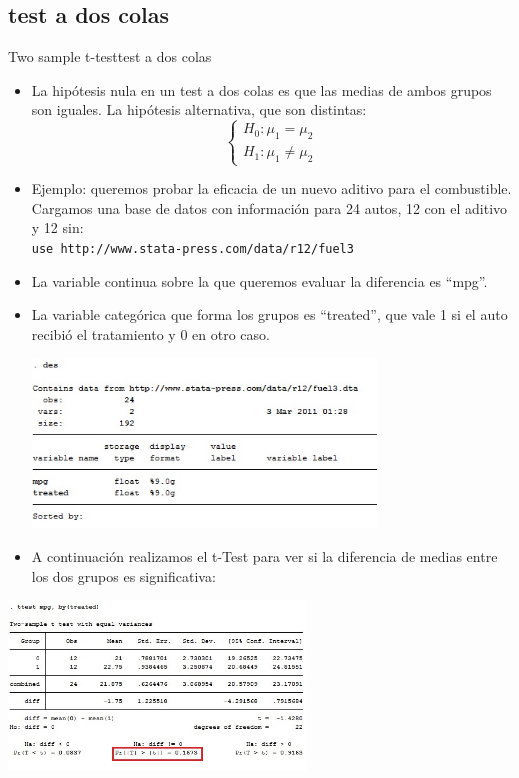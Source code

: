\documentclass{beamer}
\begin{document}
\subsection{test a dos colas}
\begin{frame}[allowframebreaks]{Two sample t-test}{test a dos colas}
\begin{itemize}
\item La hipótesis nula en un test a dos colas es que las medias de ambos grupos son iguales. La hipótesis alternativa, que son distintas: 
\begin{displaymath}
\left\{ \begin{array}{l}
H_{0}: \mu_{1} = \mu_{2} \\ 
H_{1}: \mu_{1} \neq  \mu_{2} 
\end{array} \right.
\end{displaymath}
\item Ejemplo: queremos probar la eficacia de un nuevo aditivo para el combustible. Cargamos una base de datos con información para 24 autos, 12 con el aditivo y 12 sin:\\
\small{\texttt{use http://www.stata-press.com/data/r12/fuel3}}
\item La variable continua sobre la que queremos evaluar la diferencia es ``mpg''.
\item La variable categórica que forma los grupos es ``treated'', que vale 1 si el auto recibió el tratamiento y 0 en otro caso. 
\begin{center}
\includegraphics[height=4.5cm]{ttest0.jpg}
\end{center}
\item A continuación realizamos el t-Test para ver si la diferencia de medias entre los dos grupos es significativa:
\end{itemize}
\begin{center}
\includegraphics[height=4.5cm]{ttest1.jpg}

\end{center}
\end{frame}
\end{document}
